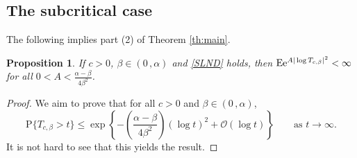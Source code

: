 \documentclass[reqno]{amsart}
\newcommand{\<}{\langle}
\renewcommand{\>}{\rangle}
\renewcommand{\P}{\mathrm{P}}
\newcommand{\E}{\mathrm{E}}
\newcommand{\1}{\mathbb{1}}
\newcommand{\e}{{\rm e}}
\renewcommand{\le}{\leqslant}
\newtheorem{proposition}[stat]{Proposition}
\theoremstyle{definition}
\numberwithin{equation}{section}
\begin{document}
\subsection{The subcritical case}

The following implies part (2) of Theorem \ref{th:main}.

\begin{proposition}\label{pr:subcritical}
	If $c>0$, $\beta\in(0\,,\alpha)$ and
	\eqref{SLND} holds, then $\E\e^{A|\log T_{c,\beta}|^2}<\infty$ for all  
	$0<A<\frac{\alpha-\beta}{4\beta^2}$.
\end{proposition}


\begin{proof}
	We aim to prove that for all $c>0$ and $\beta\in(0\,,\alpha)$,
	\begin{equation}\label{tail:goal}
		\P\{T_{c,\beta} > t\}
		\le \exp\left\{-\left(\frac{\alpha-\beta}{4\beta^2}\right)(\log t)^2
		+\mathcal{O}(\log t)\right\}\qquad\text{as $t\to\infty$}.
	\end{equation}
	It is not hard to see that this yields the result.
	

\end{proof}
\end{document}
